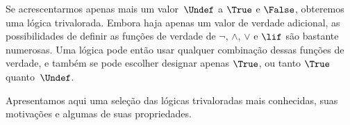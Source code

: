 \documentclass[../../../include/open-logic-section]{subfiles}
\begin{document}


Se acrescentarmos apenas mais um valor~$\Undef$ a $\True$ e $\False$, obteremos uma
lógica trivalorada. Embora haja apenas um valor de verdade adicional,
as possibilidades de definir as funções de verdade de $\lnot$,
$\land$, $\lor$ e $\lif$ são bastante numerosas. Uma lógica pode então usar
qualquer combinação dessas funções de verdade, e também se pode escolher
designar apenas $\True$, ou tanto $\True$ quanto~$\Undef$.

Apresentamos aqui uma seleção das lógicas trivaloradas mais conhecidas,
suas motivações e algumas de suas propriedades.
\end{document}

